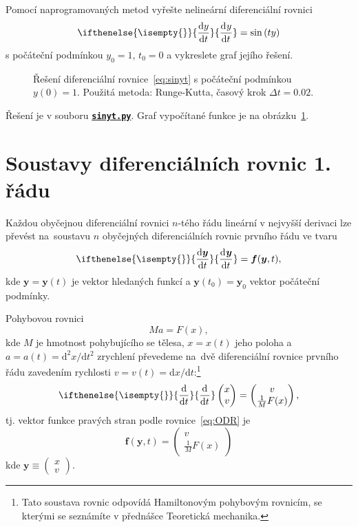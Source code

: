 \documentclass[a4paper,11pt,twoside]{article}
\def\vector#1{\boldsymbol{#1}}			%
\renewcommand{\d}{\mathrm{d}}           %
\newcommand{\derivative}[3][]{\ifthenelse{\isempty{#1}}	    %
	{\frac{\d{#2}}{\d{#3}}}
	{\frac{\d^{#1}{#2}}{\d{#3}^{#1}}}
}
\def\makematrix#1{\begin{pmatrix}#1\end{pmatrix}}
\def\ghfile#1#2{\textnormal{\textbf{\texttt{\href{https://github.com/PavelStransky/PCInPhysics/blob/main/#1#2}{#2}}}}}
\theoremstyle{red}
\theoremstyle{green}
\begin{document}
\begin{solved}
    Pomocí naprogramovaných metod vyřešte nelineární diferenciální rovnici
    \begin{equation}
        \label{eq:sinyt}
        \derivative{y}{t}=\sin\left(t y\right)
    \end{equation}
    s počáteční podmínkou $y_{0}=1$, $t_{0}=0$ a vykreslete graf jejího řešení.
\end{solved}

\begin{solution}
    \begin{figure}[!htb]
        \centering{}
        \caption{
            \protect\small
            Řešení diferenciální rovnice~\eqref{eq:sinyt} s počáteční podmínkou $y(0)=1$.
            Použitá metoda: Runge-Kutta, časový krok $\Delta t=0.02$.
        }
        \label{fig:sinyt}
    \end{figure}

    Řešení je v souboru \ghfile{python/ode/}{sinyt.py}.
    Graf vypočítané funkce je na obrázku~\ref{fig:sinyt}.
\end{solution}


\section{Soustavy diferenciálních rovnic 1. řádu}
\label{sec:ODRn}
    Každou obyčejnou diferenciální rovnici $n$-tého řádu lineární v nejvyšší derivaci lze převést na~soustavu $n$ obyčejných diferenciálních rovnic prvního řádu ve tvaru
    \begin{equation}\label{eq:ODR}
        \derivative{\vector{y}}{t}=\vector{f}(\vector{y},t),
    \end{equation}
    kde $\vector{y}=\vector{y}(t)$ je vektor hledaných funkcí a $\vector{y}(t_{0})=\vector{y}_{0}$ vektor počáteční podmínky.

    \begin{example}
        Pohybovou rovnici
        \begin{equation}
            Ma=F(x),
        \end{equation}
        kde $M$ je hmotnost pohybujícího se tělesa, $x=x(t)$ jeho poloha a $a=a(t)=\d^{2}x/\d t^{2}$ zrychlení převedeme na~dvě diferenciální rovnice prvního řádu zavedením rychlosti $v=v(t)=\d x/\d t$:\footnote{
            Tato soustava rovnic odpovídá Hamiltonovým pohybovým rovnicím, se kterými se seznámíte v přednášce Teoretická mechanika.
        }
        \begin{equation}
            \derivative{}{t}\makematrix{x \\ v}=\makematrix{v \\ \frac{1}{M}F(x)},
        \end{equation}
        tj. vektor funkce pravých stran podle rovnice~\eqref{eq:ODR} je
        \begin{equation}
            \vector{f}(\vector{y},t)=\makematrix{v \\ \frac{1}{M}F(x)}
        \end{equation}
        kde $\vector{y}\equiv\makematrix{x \\ v}$.
    \end{example}
\end{document}
